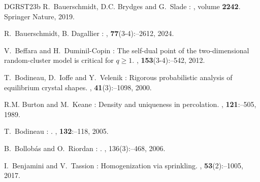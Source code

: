 \documentclass[11pt,a4paper]{article}
\theoremstyle{definition}
\numberwithin{equation}{section}
\begin{document}
\begin{thebibliography}{DGRST23b}
R.~\bgroup\fonteauteurs\bgroup Bauerschmidt\egroup\egroup{}, D.C. \bgroup\fonteauteurs\bgroup Brydges\egroup\egroup{} and G.~\bgroup\fonteauteurs\bgroup Slade\egroup\egroup{} :
, volume \textbf{2242}.
\newblock Springer Nature, 2019.

R.~\bgroup\fonteauteurs\bgroup Bauerschmidt\egroup\egroup{}, B. \bgroup\fonteauteurs\bgroup Dagallier\egroup\egroup{} :
, 
\textbf{77}(3-4)\string:--2612, 2024.


V.~\bgroup\fonteauteurs\bgroup Beffara\egroup\egroup{} and H.~\bgroup\fonteauteurs\bgroup Duminil-Copin\egroup\egroup{} :
\newblock The self-dual point of the two-dimensional random-cluster model is critical for $q\geq 1$.
, \textbf{153}(3-4)\string:--542, 2012.

T.~\bgroup\fonteauteurs\bgroup Bodineau\egroup\egroup{}, D.~\bgroup\fonteauteurs\bgroup Ioffe\egroup\egroup{} and Y.~\bgroup\fonteauteurs\bgroup Velenik\egroup\egroup{} :
\newblock Rigorous probabilistic analysis of equilibrium crystal shapes.
, \textbf{41}(3)\string:--1098, 2000.

R.M. \bgroup\fonteauteurs\bgroup Burton\egroup\egroup{} and M.~\bgroup\fonteauteurs\bgroup Keane\egroup\egroup{} :
\newblock Density and uniqueness in percolation.
, \textbf{121}\string:--505, 1989.

T.~\bgroup\fonteauteurs\bgroup Bodineau\egroup\egroup{} :
.
, \textbf{132}\string:--118, 2005.

B.~\bgroup\fonteauteurs\bgroup Bollob{\'a}s\egroup\egroup{} and O.~\bgroup\fonteauteurs\bgroup Riordan\egroup\egroup{} :
.
, 136(3)\string:--468, 2006.


I.~\bgroup\fonteauteurs\bgroup Benjamini\egroup\egroup{} and V.~\bgroup\fonteauteurs\bgroup Tassion\egroup\egroup{} :
\newblock Homogenization via sprinkling.
, \textbf{53}(2)\string:--1005, 2017.


\end{thebibliography}
\end{document}
